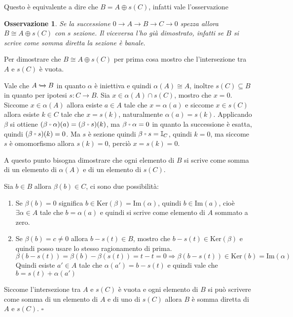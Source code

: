 \documentclass[10pt, twoside=false, x11names]{scrbook}
\newtheorem{osservation}[theorem]{Osservazione}
\newenvironment{proof}{{\textbf{Dimostrazione}:}}{\hfill $\square$}
\newcommand{\im}[1]{\mathrm{Im}( #1 )}
\renewcommand{\ker}[1]{\mathrm{Ker}( #1)}
\newcommand{\Id}[1][]{\mathbb{I}_#1}
\newcommand{\incl}{\xhookrightarrow{}}
\let\latexcirc=\circ
\newcommand{\ccirc}{\mathbin{\mathchoice
  {\xcirc\scriptstyle}
  {\xcirc\scriptstyle}
  {\xcirc\scriptscriptstyle}
  {\xcirc\scriptscriptstyle}
}}
\newcommand{\xcirc}[1]{\vcenter{\hbox{$#1\latexcirc$}}}
\let\circ\ccirc
\begin{document}
Questo è equivalente a dire che $ B = A \oplus s(C) $, infatti vale l'osservazione
\begin{osservation}
  Se la successione $ 0 \to A \to B \to C \to 0 $ spezza allora $ B \cong A \oplus s(C) $ con $ s $ sezione.
  Il viceversa l'ho già dimostrato, infatti se $ B $ si scrive come somma diretta
  la sezione è banale.
\end{osservation}
\begin{proof}
  Per dimostrare che $ B \cong A \oplus s(C) $ per prima cosa mostro che l'intersezione
  tra $ A $ e $ s(C) $ è vuota.

  Vale che $ A \incl B $ in quanto $ \alpha $ è iniettiva e quindi $ \alpha(A) \cong A $, inoltre
  $ s(C) \subseteq B $ in quanto per ipotesi $ s \colon C \to B $.
  Sia $ x \in \alpha(A) \cap s(C) $, mostro che $ x = 0 $.%
  Siccome $ x \in \alpha(A) $ allora esiste $ a \in A $ tale che $ x = \alpha(a) $ e siccome
  $ x \in s(C) $ allora esiste $ k \in C $ tale che
  $ x = s(k) $, naturalmente $ \alpha(a) = s(k) $. Applicando $ \beta $ si ottiene
  $ (\beta \circ \alpha) (a) = (\beta \circ s)(k) $, ma $ \beta \circ \alpha = 0 $ in quanto la successione è esatta, quindi
  $ (\beta \circ s)(k) = 0 $. Ma $ s $ è sezione quindi $ \beta \circ s = \Id{C} $, quindi $ k = 0 $, ma
  siccome $ s $ è omomorfismo allora $ s(k) = 0 $, perciò $ x = s(k) = 0 $.

  A questo punto bisogna dimostrare che ogni elemento di $ B $ si scrive come somma
  di un elemento di $ \alpha(A) $ e di un elemento
  di $ s(C) $.

  Sia $ b \in B $ allora $ \beta(b) \in C $, ci sono due possibilità:
  \begin{enumerate}
  \item Se $ \beta(b) = 0 $ significa $ b \in \ker{\beta} = \im{\alpha} $, quindi $ b \in \im{a} $, cioè
    $ \exists \alpha \in A $ tale che $ b = \alpha(a) $ e quindi si scrive come elemento di $ A $ sommato
    a zero.
  \item Se $ \beta(b) = c \not = 0 $ allora $ b - s(t) \in B $,
    mostro che $ b - s(t) \in \ker{\beta} $ e quindi posso usare lo stesso ragionamento
    di prima.
    \[
      \beta(b - s(t)) = \beta(b) - \beta(s(t)) = t - t = 0 \Rightarrow \beta(b - s(t)) \in \ker{b} = \im{\alpha}
    \]
    Quindi esiste $ a' \in A $ tale che $ \alpha(a') = b - s(t) $ e quindi
    vale che $ b = s(t) + \alpha(a') $
  \end{enumerate}
  Siccome l'intersezione tra $ A $ e $ s(C) $ è vuota e ogni elemento di $ B $
  si può scrivere come somma di un elemento di $ A $ e di uno di $ s(C) $ allora
  $ B $ è somma diretta di $ A $ e $ s(C) $.
\end{proof}
\end{document}
